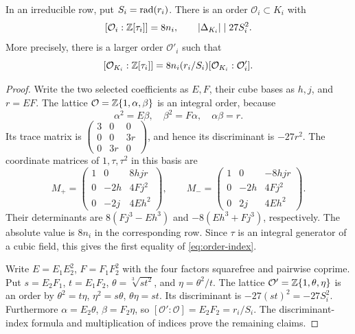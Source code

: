 \begin{proposition}\label{prop:exact-cubic-order-index}
In an irreducible row, put $S_i=\operatorname{rad}(r_i)$. There is an order
$\mathcal O_i\subset K_i$ with
\begin{equation}\label{eq:order-index}
 [\mathcal O_i:\mathbb Z[\tau_i]]=8n_i,
 \qquad |\Delta_{K_i}|\mid27S_i^2.
\end{equation}
More precisely, there is a larger order $\mathcal O'_i$ such that
\begin{equation}\label{eq:full-order-index}
 [\mathcal O_{K_i}:\mathbb Z[\tau_i]]
   =8n_i(r_i/S_i)[\mathcal O_{K_i}:\mathcal O'_i].
\end{equation}
\end{proposition}
\begin{proof}
Write the two selected coefficients as $E,F$, their cube bases as
$h,j$, and $r=EF$. The lattice
$\mathcal O=\mathbb Z\{1,\alpha,\beta\}$ is an integral order, because
\[
 \alpha^2=E\beta,\quad \beta^2=F\alpha,\quad \alpha\beta=r.
\]
Its trace matrix is
$\left(\begin{smallmatrix}3&0&0\\0&0&3r\\0&3r&0\end{smallmatrix}\right)$,
and hence its discriminant is $-27r^2$.
The coordinate matrices of $1,\tau,\tau^2$ in this basis are
\[
 M_+=\begin{pmatrix}1&0&8hjr\\0&-2h&4Fj^2\\0&-2j&4Eh^2\end{pmatrix},
 \qquad
 M_-=\begin{pmatrix}1&0&-8hjr\\0&-2h&4Fj^2\\0&2j&4Eh^2\end{pmatrix}.
\]
Their determinants are $8(Fj^3-Eh^3)$ and $-8(Eh^3+Fj^3)$,
respectively. The absolute value is $8n_i$ in the corresponding row.
Since $\tau$ is an integral generator of a cubic field, this gives
the first equality of \eqref{eq:order-index}.

Write $E=E_1E_2^2$, $F=F_1F_2^2$ with the four factors squarefree
and pairwise coprime. Put $s=E_2F_1$, $t=E_1F_2$,
$\theta=\sqrt[3]{st^2}$, and $\eta=\theta^2/t$.
The lattice $\mathcal O'=\mathbb Z\{1,\theta,\eta\}$ is an order by
$\theta^2=t\eta$, $\eta^2=s\theta$, $\theta\eta=st$.
Its discriminant is $-27(st)^2=-27S_i^2$. Furthermore
$\alpha=E_2\theta$, $\beta=F_2\eta$, so
$[\mathcal O':\mathcal O]=E_2F_2=r_i/S_i$.
The discriminant-index formula and multiplication of indices prove
the remaining claims.
\end{proof}


